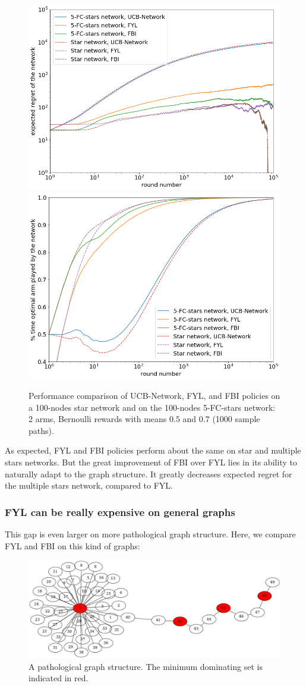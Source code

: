 \documentclass{article}
\begin{document}
\begin{figure}[H]
  \centering
  \includegraphics[width=0.49\linewidth]{fig4_1.png}
  \includegraphics[width=0.49\linewidth]{fig4_2.png}
  \caption{Performance comparison of UCB-Network, FYL, and FBI policies on a 100-nodes star network and on the 100-nodes 5-FC-stars network: 2 arms, Bernoulli rewards with means $0.5$ and $0.7$ (1000 sample paths).}
\end{figure}

As expected, FYL and FBI policies perform about the same on star and multiple stars networks. But the great improvement of FBI over FYL lies in its ability to naturally adapt to the graph structure. It greatly decreases expected regret for the multiple stars network, compared to FYL.

\subsubsection{FYL can be really expensive on general graphs}

This gap is even larger on more pathological graph structure. Here, we compare FYL and FBI on this kind of graphs:

\begin{figure}[H]
  \centering
  \includegraphics[width=0.6\linewidth]{star-chain.jpg}
  \caption{A pathological graph structure. The minimum dominating set is indicated in red.}
\end{figure}
\end{document}
